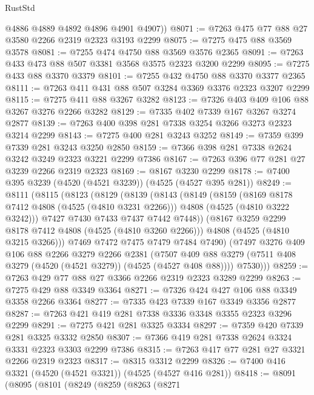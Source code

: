 \begin{lexlean}{RustStd}
\begin{coremodule}
        @4886
        @4889
        @4892
        @4896
        @4901
        @4907))
@8071 := @7263 @475 @77 @88 @27 @3580 @2266 @2319 @2323 @3193 @2299
@8075 := @7275 @475 @88 @3569 @3578
@8081 := @7255 @474 @4750 @88 @3569 @3576 @2365
@8091 := @7263 @433 @473 @88 @507 @3381 @3568 @3575 @2323 @3200 @2299
@8095 := @7275 @433 @88 @3370 @3379
@8101 := @7255 @432 @4750 @88 @3370 @3377 @2365
@8111 := @7263 @411 @431 @88 @507 @3284 @3369 @3376 @2323 @3207 @2299
@8115 := @7275 @411 @88 @3267 @3282
@8123 := @7326 @403 @409 @106 @88 @3267 @3276 @2266 @3282
@8129 := @7335 @402 @7339 @167 @3267 @3274 @2877
@8139 := @7263 @400 @398 @281 @7338 @3254 @3266 @3273 @2323 @3214 @2299
@8143 := @7275 @400 @281 @3243 @3252
@8149 := @7359 @399 @7339 @281 @3243 @3250 @2850
@8159 := @7366 @398 @281 @7338 @2624 @3242 @3249 @2323 @3221 @2299 @7386
@8167 := @7263 @396 @77 @281 @27 @3239 @2266 @2319 @2323
@8169 := @8167 @3230 @2299
@8178 := @7400 @395 @3239 (@4520 (@4521 @3239)) (@4525 (@4527 @395 @281))
@8249 := @8111
    (@8115
      (@8123
        (@8129
          (@8139
            (@8143
              (@8149
                (@8159
                  (@8169 @8178 @7412 @4808 (@4525 (@4810 @3231 @2266)))
                  @4808
                  (@4525 (@4810 @3222 @3242)))
                @7427
                @7430
                @7433
                @7437
                @7442
                @7448))
            (@8167 @3259 @2299 @8178 @7412 @4808 (@4525 (@4810 @3260 @2266)))
            @4808
            (@4525 (@4810 @3215 @3266)))
          @7469
          @7472
          @7475
          @7479
          @7484
          @7490)
        (@7497
          @3276
          @409
          @106
          @88
          @2266
          @3279
          @2266
          @2381
          (@7507 @409 @88 @3279 (@7511 @408 @3279 (@4520 (@4521 @3279)) (@4525 (@4527 @408 @88))))
          @7530)))
@8259 := @7263 @429 @77 @88 @27 @3366 @2266 @2319 @2323 @3289 @2299
@8263 := @7275 @429 @88 @3349 @3364
@8271 := @7326 @424 @427 @106 @88 @3349 @3358 @2266 @3364
@8277 := @7335 @423 @7339 @167 @3349 @3356 @2877
@8287 := @7263 @421 @419 @281 @7338 @3336 @3348 @3355 @2323 @3296 @2299
@8291 := @7275 @421 @281 @3325 @3334
@8297 := @7359 @420 @7339 @281 @3325 @3332 @2850
@8307 := @7366 @419 @281 @7338 @2624 @3324 @3331 @2323 @3303 @2299 @7386
@8315 := @7263 @417 @77 @281 @27 @3321 @2266 @2319 @2323
@8317 := @8315 @3312 @2299
@8326 := @7400 @416 @3321 (@4520 (@4521 @3321)) (@4525 (@4527 @416 @281))
@8418 := @8091
    (@8095
      (@8101
        (@8249
          (@8259
            (@8263
              (@8271

\end{coremodule}
\end{lexlean}

